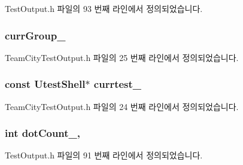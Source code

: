 Test\+Output.\+h 파일의 93 번째 라인에서 정의되었습니다.

\subsubsection[{\texorpdfstring{curr\+Group\+\_\+}{currGroup_}}]{ curr\+Group\+\_\+\hspace{0.3cm}{\ttfamily [private]}}\hypertarget{class_team_city_test_output_a9dc3c1a55caf7bc0e5b4b28d686e866f}{}\label{class_team_city_test_output_a9dc3c1a55caf7bc0e5b4b28d686e866f}


Team\+City\+Test\+Output.\+h 파일의 25 번째 라인에서 정의되었습니다.

\subsubsection[{\texorpdfstring{currtest\+\_\+}{currtest_}}]{\setlength{\rightskip}{0pt plus 5cm}const {\bf Utest\+Shell}$\ast$ currtest\+\_\+\hspace{0.3cm}{\ttfamily [private]}}\hypertarget{class_team_city_test_output_a5dc621283d75466dfdb5169ca66eb571}{}\label{class_team_city_test_output_a5dc621283d75466dfdb5169ca66eb571}


Team\+City\+Test\+Output.\+h 파일의 24 번째 라인에서 정의되었습니다.

\subsubsection[{\texorpdfstring{dot\+Count\+\_\+}{dotCount_}}]{\setlength{\rightskip}{0pt plus 5cm}int dot\+Count\+\_\+\hspace{0.3cm}{\ttfamily [protected]}, {\ttfamily [inherited]}}\hypertarget{class_test_output_a3c1c7e8cf0310d384198f0dc504251c6}{}\label{class_test_output_a3c1c7e8cf0310d384198f0dc504251c6}


Test\+Output.\+h 파일의 91 번째 라인에서 정의되었습니다.

